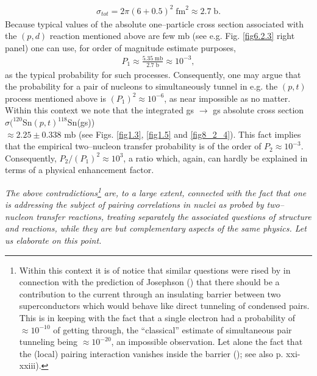 \begin{align}
\sigma_{tot}=2\pi(6+0.5)^2\;\text{fm}^2\approx 2.7\;\text{b}.
\end{align}
Because typical values of the absolute one--particle cross section associated  with the $(p,d)$ reaction mentioned above are few mb (see e.g. Fig. \ref{fig6.2.3} right panel) one can use, for order of magnitude estimate purposes,  
\begin{align}
P_1\approx\frac{5.35\; \text{mb}}{2.7\;\text{b}}\approx 10^{-3},
\end{align}
as the typical probability for such processes. Consequently, one may argue that the probability for a  pair of nucleons to simultaneously tunnel in e.g. the $(p,t)$ process mentioned above is $(P_1)^2\approx10^{-6}$, as near impossible as no matter. Within this context we note that the integrated gs $\rightarrow$ gs absolute cross section $\sigma(^{120}$Sn$(p,t)^{118}$Sn(gs))\\$\approx 2.25 \pm$0.338 mb (see Figs. \ref{fig1.3}, \ref{fig1.5} and \ref{fig8_2_4}). This fact implies that the empirical two--nucleon transfer probability is of the order of $P_2\approx 10^{-3}$. Consequently, $P_2/(P_1)^2\approx 10^{3}$, a ratio which, again, can hardly be explained in terms of a physical enhancement factor.


\textit{The above contradictions\footnote{Within this context it is of notice that similar questions were rised by \cite{Bardeen:62,Bardeen:61,Pippard:12,Cohen:62,McDonald:01} in connection with the prediction of Josephson (\cite{Josephson:62}) that there should be a contribution to the current through an insulating barrier between two superconductors which would behave like direct tunneling of condensed pairs. This is in keeping with the fact that a single electron had a probability of $\approx 10^{-10}$ of getting through, the ``classical'' estimate of simultaneous pair tunneling being $\approx 10^{-20}$, an impossible observation. Let alone the fact that the (local) pairing interaction vanishes inside the barrier (\cite{Bardeen:61,McDonald:01,Anderson:64b,Anderson:70}); see also \cite{Bohr:19} p. xxi-xxiii).}  are, to a large extent, connected with the fact that one is addressing the subject of pairing correlations in nuclei as probed by two--nucleon transfer reactions, treating separately the associated questions of structure and reactions, while they are but complementary aspects of the same physics. Let us elaborate on this point. }

